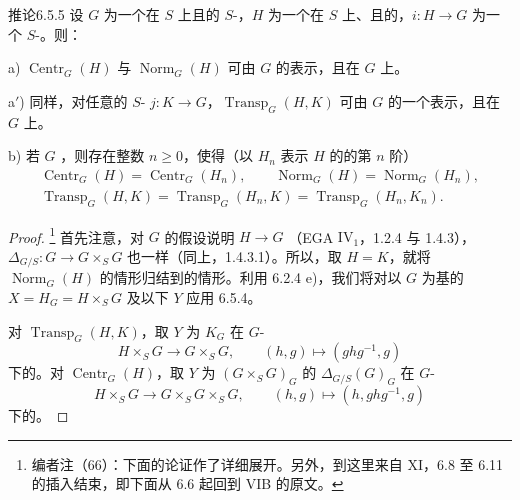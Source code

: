 \begin{SGAresult}{推论}{6.5.5}
设 $G$ 为一个在 $S$ 上且的 $S$-，$H$ 为一个在 $S$ 上、且的，$i:H\to G$ 为一个 $S$-。则：

a) $\operatorname{Centr}_G(H)$ 与 $\operatorname{Norm}_G(H)$ 可由 $G$ 的表示，且在 $G$ 上。

a$'$) 同样，对任意的 $S$- $j:K\to G$，$\operatorname{Transp}_G(H,K)$ 可由 $G$ 的一个表示，且在 $G$ 上。

b) 若 $G$ ，则存在整数 $n\geq0$，使得（以 $H_n$ 表示 $H$ 的的第 $n$ 阶）
\[
\begin{gathered}
\operatorname{Centr}_G(H)=\operatorname{Centr}_G(H_n),\qquad
\operatorname{Norm}_G(H)=\operatorname{Norm}_G(H_n),\\
\operatorname{Transp}_G(H,K)=\operatorname{Transp}_G(H_n,K)
=\operatorname{Transp}_G(H_n,K_n).
\end{gathered}
\]
\end{SGAresult}
\begin{proof}
\footnote{编者注（66）：下面的论证作了详细展开。另外，到这里来自 XI，6.8 至 6.11 的插入结束，即下面从 6.6 起回到 VIB 的原文。}
首先注意，对 $G$ 的假设说明 $H\to G$ （EGA $\mathrm{IV}_1$，1.2.4 与 1.4.3）， $\Delta_{G/S}:G\to G\times_S G$ 也一样（同上，1.4.3.1）。所以，取 $H=K$，就将 $\operatorname{Norm}_G(H)$ 的情形归结到的情形。利用 6.2.4 e)，我们将对以 $G$ 为基的 $X=H_G=H\times_S G$ 及以下 $Y$ 应用 6.5.4。

对 $\operatorname{Transp}_G(H,K)$，取 $Y$ 为 $K_G$ 在 $G$-
\[
H\times_S G\longrightarrow G\times_S G,\qquad(h,g)\longmapsto(ghg^{-1},g)
\]
下的。对
$\operatorname{Centr}_G(H)$，取 $Y$ 为 $(G\times_S G)_G$ 的 $\Delta_{G/S}(G)_G$ 在 $G$-
\[
H\times_S G\longrightarrow G\times_S G\times_S G,\qquad
(h,g)\longmapsto(h,ghg^{-1},g)
\]
下的。
\end{proof}

